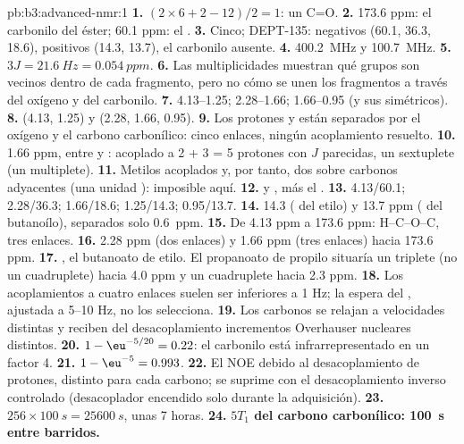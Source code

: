 \begin{solution}{pb:b3:advanced-nmr:1}
\textbf{1.} $(2 \times 6 + 2 - 12)/2 = 1$: un C=O.
\textbf{2.} 173.6 ppm: el carbonilo del éster; 60.1 ppm: el .
\textbf{3.} Cinco; DEPT-135:  negativos (60.1, 36.3, 18.6),  positivos (14.3,
13.7), el carbonilo ausente.
\textbf{4.} \qty{400.2}{MHz} y \qty{100.7}{MHz}.
\textbf{5.} $3J = \qty{21.6}{Hz} = \qty{0.054}{ppm}$.
\textbf{6.} Las multiplicidades muestran qué grupos son vecinos dentro de cada
fragmento, pero no cómo se unen los fragmentos a través del oxígeno y del carbonilo.
\textbf{7.} 4.13--1.25; 2.28--1.66; 1.66--0.95 (y sus simétricos).
\textbf{8.}  (4.13, 1.25) y  (2.28, 1.66, 0.95).
\textbf{9.} Los protones  y  están separados por el oxígeno y el
carbono carbonílico: cinco enlaces, ningún acoplamiento resuelto.
\textbf{10.} 1.66 ppm, entre  y : acoplado a 2 + 3 = 5 protones con
$J$ parecidas, un sextuplete (un multiplete).
\textbf{11.} Metilos acoplados y, por tanto, dos  sobre carbonos adyacentes (una unidad ): imposible aquí.
\textbf{12.}  y , más el .
\textbf{13.} 4.13/60.1; 2.28/36.3; 1.66/18.6; 1.25/14.3; 0.95/13.7.
\textbf{14.} 14.3 ( del etilo) y 13.7 ppm ( del butanoílo), separados solo \qty{0.6}{ppm}.
\textbf{15.} De 4.13 ppm a 173.6 ppm: H--C--O--C, tres enlaces.
\textbf{16.} 2.28 ppm (dos enlaces) y 1.66 ppm (tres enlaces) hacia 173.6 ppm.
\textbf{17.} , el butanoato de etilo. El propanoato de propilo situaría un
triplete  (no un cuadruplete) hacia 4.0 ppm y un cuadruplete hacia 2.3 ppm.
\textbf{18.} Los acoplamientos a cuatro enlaces suelen ser inferiores a 1 Hz; la espera del , ajustada a
5--10 Hz, no los selecciona.
\textbf{19.} Los carbonos se relajan a velocidades distintas y reciben del desacoplamiento
incrementos Overhauser nucleares distintos.
\textbf{20.} $1 - \eu^{-5/20} = 0.22$: el carbonilo está infrarrepresentado en un factor 4.
\textbf{21.} $1 - \eu^{-5} = 0.993$.
\textbf{22.} El NOE debido al desacoplamiento de protones, distinto para cada carbono; se suprime
con el desacoplamiento inverso controlado (desacoplador encendido solo durante la adquisición).
\textbf{23.} $256 \times \qty{100}{s} = \qty{25600}{s}$, unas 7 horas.
\textbf{24.} \textbf{$5T_1$ del carbono carbonílico: \qty{100}{s} entre barridos.}
\end{solution}
